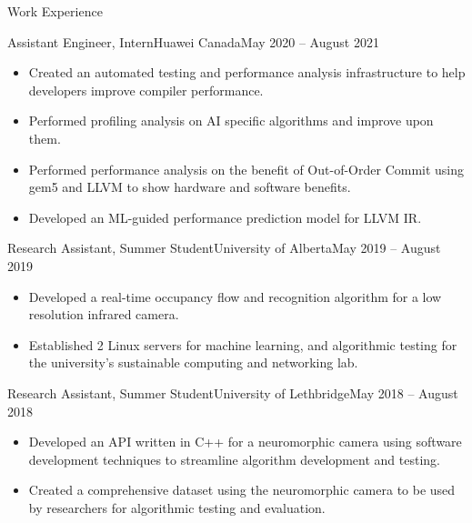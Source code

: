 \documentclass[]{mcdowellcv}
\begin{document}
\vspace*{-10pt}
\begin{cvsection}{Work Experience}
   \begin{cvsubsection}{Assistant Engineer, Intern}{Huawei Canada}{May 2020 -- August 2021}
    \vspace*{5pt}
    \begin{itemize}
      \item Created an automated testing and performance analysis infrastructure to help developers improve compiler performance.
      \item Performed profiling analysis on AI specific algorithms and improve upon them.
      \item Performed performance analysis on the benefit of Out-of-Order Commit using gem5 and LLVM to show hardware and software benefits.
      \item Developed an ML-guided performance prediction model for LLVM IR.
    \end{itemize}
  \end{cvsubsection}
  
  \begin{cvsubsection}{Research Assistant, Summer Student}{University of Alberta}{May 2019 -- August 2019}
    \vspace*{5pt}		
    \begin{itemize}
      \item Developed a real-time occupancy flow and recognition algorithm for a low resolution infrared camera.
      \item Established 2 Linux servers for machine learning, and algorithmic testing for the university's sustainable computing and networking lab.
    \end{itemize}
  \end{cvsubsection}
 
  \begin{cvsubsection}{Research Assistant, Summer Student}{University of Lethbridge}{May 2018 -- August 2018}	
    \vspace*{5pt}
    \begin{itemize}
      \item Developed an API written in C++ for a neuromorphic camera using software development techniques to streamline algorithm development and testing.
      \item Created a comprehensive dataset using the neuromorphic camera to be used by researchers for algorithmic testing and evaluation.
    \end{itemize}
  \end{cvsubsection}
\end{cvsection}
\end{document}

